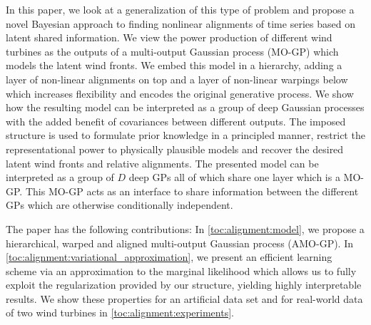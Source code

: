 In this paper, we look at a generalization of this type of problem and propose a novel Bayesian approach to finding nonlinear alignments of time series based on latent shared information.
We view the power production of different wind turbines as the outputs of a multi-output Gaussian process (MO-GP) \parencite{alvarez_kernels_2011} which models the latent wind fronts.
We embed this model in a hierarchy, adding a layer of non-linear alignments on top and a layer of non-linear warpings \parencites{snelson_warped_2004,lazaro-gredilla_bayesian_2012} below which increases flexibility and encodes the original generative process.
We show how the resulting model can be interpreted as a group of deep Gaussian processes with the added benefit of covariances between different outputs.
The imposed structure is used to formulate prior knowledge in a principled manner, restrict the representational power to physically plausible models and  recover the desired latent wind fronts and relative alignments.
The presented model can be interpreted as a group of $D$ deep GPs all of which share one layer which is a MO-GP.
This MO-GP acts as an interface to share information between the different GPs which are otherwise conditionally independent.

The paper has the following contributions:
In \cref{toc:alignment:model}, we propose a hierarchical, warped and aligned  multi-output Gaussian process (AMO-GP).
In \cref{toc:alignment:variational_approximation}, we present an efficient learning scheme via an approximation to the marginal likelihood which allows us to fully exploit the regularization provided by our structure, yielding highly interpretable results.
We show these properties for an artificial data set and for real-world data of two wind turbines in \cref{toc:alignment:experiments}.

